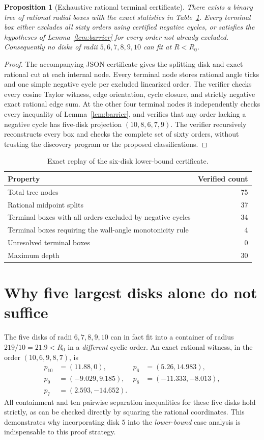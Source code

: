 \documentclass[11pt,a4paper]{article}
\newtheorem{proposition}[theorem]{Proposition}
\begin{document}
\begin{proposition}[Exhaustive rational terminal certificate]\label{prop:tree}
There exists a binary tree of rational radial boxes with the exact
statistics in Table~\ref{tab:tree}.  Every terminal box either excludes
all sixty orders using certified negative cycles, or satisfies the
hypotheses of Lemma~\ref{lem:barrier} for every order not already excluded.
Consequently no disks of radii $5,6,7,8,9,10$ can fit at $R<R_0$.
\end{proposition}
\begin{proof}
The accompanying JSON certificate gives the splitting disk and exact
rational cut at each internal node.  Every terminal node stores rational
angle ticks and one simple negative cycle per excluded linearized order.
The verifier checks every cosine Taylor witness, edge orientation, cycle
closure, and strictly negative exact rational edge sum.  At the other
four terminal nodes it independently checks every inequality of
Lemma~\ref{lem:barrier}, and verifies that any order lacking a negative
cycle has five-disk projection $(10,8,6,7,9)$.  The verifier recursively
reconstructs every box and checks the complete set of sixty orders,
without trusting the discovery program or the proposed classifications.
\end{proof}
\begin{table}[htbp]\centering
\caption{Exact replay of the six-disk lower-bound certificate.}\label{tab:tree}
\begin{tabular}{lr}\toprule
Property & Verified count\\\midrule
Total tree nodes & 75\\
Rational midpoint splits & 37\\
Terminal boxes with all orders excluded by negative cycles & 34\\
Terminal boxes requiring the wall-angle monotonicity rule & 4\\
Unresolved terminal boxes & 0\\
Maximum depth & 30\\\bottomrule
\end{tabular}
\end{table}

\section{Why five largest disks alone do not suffice}
The five disks of radii $6,7,8,9,10$ can in fact fit into a container of
radius $219/10=21.9<R_0$ in a \emph{different} cyclic order.
An exact rational witness, in the order $(10,6,9,8,7)$, is
\[
\begin{aligned}
 p_{10}&=(11.88,0),&p_6&=(5.26,14.983),\\
 p_9&=(-9.029,9.185),&p_8&=(-11.333,-8.013),\\
 p_7&=(2.593,-14.652).&&
\end{aligned}
\]
All containment and ten pairwise separation inequalities for these five
disks hold strictly, as can be checked directly by squaring the rational
coordinates.  This demonstrates why incorporating disk $5$ into the
\emph{lower-bound} case analysis is indispensable to this proof strategy.
\end{document}
